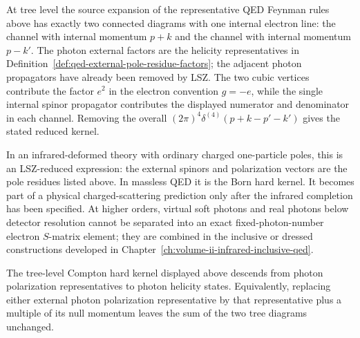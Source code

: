 At tree level the source expansion of
the representative QED Feynman rules above has exactly two
connected diagrams with one internal electron line: the channel with internal
momentum \(p+k\) and the channel with internal momentum \(p-k'\).  The photon
external factors are the helicity representatives in
Definition~\ref{def:qed-external-pole-residue-factors}; the adjacent photon
propagators have already been removed by LSZ.  The two cubic vertices
contribute the factor \(e^2\) in the electron convention \(g=-e\), while the
single internal spinor propagator contributes the displayed numerator and
denominator in each channel.  Removing the overall
\((2\pi)^4\delta^{(4)}(p+k-p'-k')\) gives the stated reduced kernel.

In an infrared-deformed theory with ordinary charged one-particle poles, this
is an LSZ-reduced expression: the external spinors and polarization vectors
are the pole residues listed above.  In massless QED it is the Born hard
kernel.  It becomes part of a physical charged-scattering prediction only
after the infrared completion has been specified.  At higher orders, virtual
soft photons and real photons below detector resolution cannot be separated
into an exact fixed-photon-number electron \(S\)-matrix element; they are
combined in the inclusive or dressed constructions developed in
Chapter~\ref{ch:volume-ii-infrared-inclusive-qed}.

\begin{lemma}
\label{lem:qed-compton-tree-ward-identity}
The tree-level Compton hard kernel displayed above
descends from photon polarization representatives to photon helicity states.
Equivalently, replacing either external photon polarization representative by
that representative plus a multiple of its null momentum leaves the sum of the
two tree diagrams unchanged.
\end{lemma}


